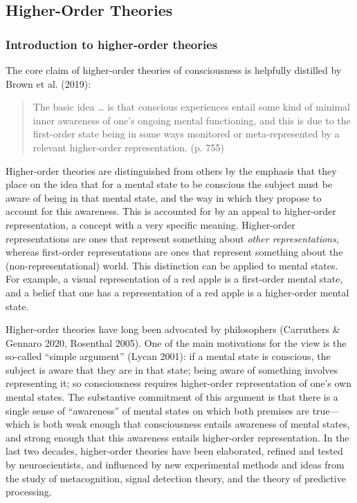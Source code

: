 \documentclass[12pt]{article}
\newenvironment{myquote}
  {\begin{quote}\leftskip=1cm\rightskip=1cm}
  {\end{quote}}
\begin{document}
\subsection{Higher-Order Theories}

\subsubsection{Introduction to higher-order theories}
The core claim of higher-order theories of consciousness is helpfully distilled by Brown et al. (2019):

\begin{myquote}
The basic idea … is that conscious experiences entail some kind of minimal inner awareness of one’s ongoing mental functioning, and this is due to the first-order state being in some ways monitored or meta-represented by a relevant higher-order representation. (p. 755)
\end{myquote}

Higher-order theories are distinguished from others by the emphasis that they place on the idea that for a mental state to be conscious the subject must be aware of being in that mental state, and the way in which they propose to account for this awareness. This is accounted for by an appeal to higher-order representation, a concept with a very specific meaning. Higher-order representations are ones that represent something about \textit{other representations}, whereas first-order representations are ones that represent something about the (non-representational) world. This distinction can be applied to mental states. For example, a visual representation of a red apple is a first-order mental state, and a belief that one has a representation of a red apple is a higher-order mental state.

Higher-order theories have long been advocated by philosophers (Carruthers \& Gennaro 2020, Rosenthal 2005). One of the main motivations for the view is the so-called ``simple argument'' (Lycan 2001): if a mental state is conscious, the subject is aware that they are in that state; being aware of something involves representing it; so consciousness requires higher-order representation of one’s own mental states. The substantive commitment of this argument is that there is a single sense of ``awareness'' of mental states on which both premises are true—which is both weak enough that consciousness entails awareness of mental states, and strong enough that this awareness entails higher-order representation. In the last two decades, higher-order theories have been elaborated, refined and tested by neuroscientists, and influenced by new experimental methods and ideas from the study of metacognition, signal detection theory, and the theory of predictive processing.
\end{document}
